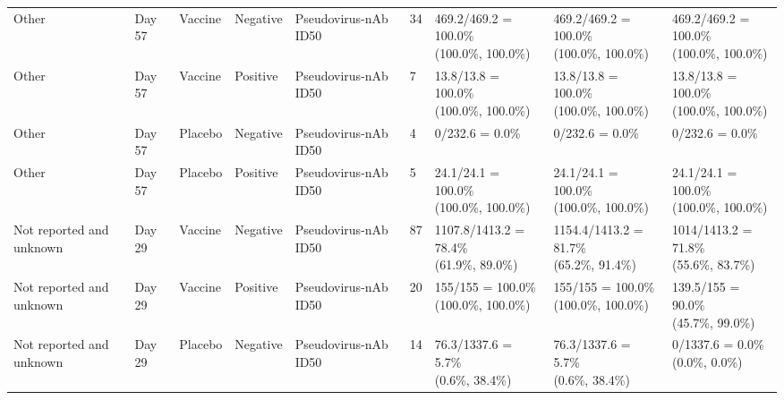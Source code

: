 \documentclass[]{book}
\theoremstyle{definition}
\theoremstyle{definition}
\theoremstyle{definition}
\newcommand{\1}{\mathbbm{1}}
\begin{document}
\begin{landscape}
\begin{ThreePartTable}
\begin{longtable}[t]{>{\raggedright\arraybackslash}p{2.7cm}llllllll}
\hspace{1em}Other & Day 57 & Vaccine & Negative & Pseudovirus-nAb ID50 & 34 & \makecell[l]{469.2/469.2 = 100.0\%\\(100.0\%, 100.0\%)} & \makecell[l]{469.2/469.2 = 100.0\%\\(100.0\%, 100.0\%)} & \makecell[l]{469.2/469.2 = 100.0\%\\(100.0\%, 100.0\%)}\\
\hspace{1em}Other & Day 57 & Vaccine & Positive & Pseudovirus-nAb ID50 & 7 & \makecell[l]{13.8/13.8 = 100.0\%\\(100.0\%, 100.0\%)} & \makecell[l]{13.8/13.8 = 100.0\%\\(100.0\%, 100.0\%)} & \makecell[l]{13.8/13.8 = 100.0\%\\(100.0\%, 100.0\%)}\\
\hspace{1em}Other & Day 57 & Placebo & Negative & Pseudovirus-nAb ID50 & 4 & 0/232.6 = 0.0\% & 0/232.6 = 0.0\% & 0/232.6 = 0.0\%\\
\hspace{1em}Other & Day 57 & Placebo & Positive & Pseudovirus-nAb ID50 & 5 & \makecell[l]{24.1/24.1 = 100.0\%\\(100.0\%, 100.0\%)} & \makecell[l]{24.1/24.1 = 100.0\%\\(100.0\%, 100.0\%)} & \makecell[l]{24.1/24.1 = 100.0\%\\(100.0\%, 100.0\%)}\\
\hspace{1em}Not reported and unknown & Day 29 & Vaccine & Negative & Pseudovirus-nAb ID50 & 87 & \makecell[l]{1107.8/1413.2 = 78.4\%\\(61.9\%, 89.0\%)} & \makecell[l]{1154.4/1413.2 = 81.7\%\\(65.2\%, 91.4\%)} & \makecell[l]{1014/1413.2 = 71.8\%\\(55.6\%, 83.7\%)}\\
\hspace{1em}Not reported and unknown & Day 29 & Vaccine & Positive & Pseudovirus-nAb ID50 & 20 & \makecell[l]{155/155 = 100.0\%\\(100.0\%, 100.0\%)} & \makecell[l]{155/155 = 100.0\%\\(100.0\%, 100.0\%)} & \makecell[l]{139.5/155 = 90.0\%\\(45.7\%, 99.0\%)}\\
\hspace{1em}Not reported and unknown & Day 29 & Placebo & Negative & Pseudovirus-nAb ID50 & 14 & \makecell[l]{76.3/1337.6 = 5.7\%\\(0.6\%, 38.4\%)} & \makecell[l]{76.3/1337.6 = 5.7\%\\(0.6\%, 38.4\%)} & \makecell[l]{0/1337.6 = 0.0\%\\(0.0\%, 0.0\%)}\\

\end{longtable}
\end{ThreePartTable}
\end{landscape}
\end{document}
